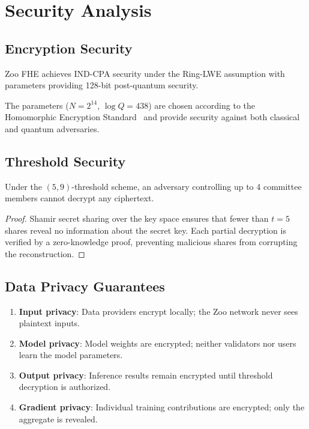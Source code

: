 \section{Security Analysis}


\subsection{Encryption Security}

\begin{theorem}
Zoo FHE achieves IND-CPA security under the Ring-LWE assumption with parameters providing 128-bit post-quantum security.
\end{theorem}

The parameters ($N = 2^{14}$, $\log Q = 438$) are chosen according to the Homomorphic Encryption Standard~\cite{albrecht2018hes} and provide security against both classical and quantum adversaries.

\subsection{Threshold Security}

\begin{theorem}
Under the $(5, 9)$-threshold scheme, an adversary controlling up to 4 committee members cannot decrypt any ciphertext.
\end{theorem}

\begin{proof}
Shamir secret sharing over the key space ensures that fewer than $t = 5$ shares reveal no information about the secret key. Each partial decryption is verified by a zero-knowledge proof, preventing malicious shares from corrupting the reconstruction.
\end{proof}

\subsection{Data Privacy Guarantees}

\begin{enumerate}
    \item \textbf{Input privacy}: Data providers encrypt locally; the Zoo network never sees plaintext inputs.
    \item \textbf{Model privacy}: Model weights are encrypted; neither validators nor users learn the model parameters.
    \item \textbf{Output privacy}: Inference results remain encrypted until threshold decryption is authorized.
    \item \textbf{Gradient privacy}: Individual training contributions are encrypted; only the aggregate is revealed.
\end{enumerate}

